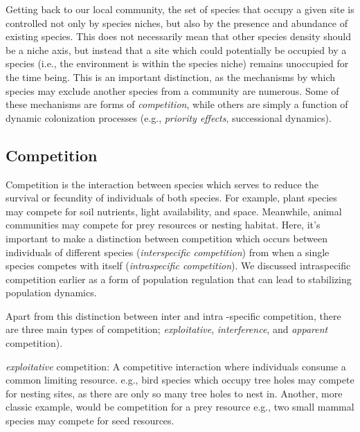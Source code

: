 \documentclass[12pt]{article}
\begin{document}
Getting back to our local community, the set of species that occupy a given site is controlled not only by species niches, but also by the presence and abundance of existing species. This does not necessarily mean that other species density should be a niche axis, but instead that a site which could potentially be occupied by a species (i.e., the environment is within the species niche) remains unoccupied for the time being. This is an important distinction, as the mechanisms by which species may exclude another species from a community are numerous. Some of these mechanisms are forms of \textit{competition}, while others are simply a function of dynamic colonization processes (e.g., \textit{priority effects}, successional dynamics). 












\clearpage
\subsection*{Competition}

Competition is the interaction between species which serves to reduce the survival or fecundity of individuals of both species. For example, plant species may compete for soil nutrients, light availability, and space. Meanwhile, animal communities may compete for prey resources or nesting habitat. Here, it's important to make a distinction between competition which occurs between individuals of different species (\textit{interspecific competition}) from when a single species competes with itself (\textit{intraspecific competition}). We discussed intraspecific competition earlier as a form of population regulation that can lead to stabilizing population dynamics. 

Apart from this distinction between inter and intra -specific competition, there are three main types of competition; \textit{exploitative},  \textit{interference},  and \textit{apparent} competition). 



\textit{exploitative} competition: A competitive interaction where individuals consume a common limiting resource. e.g., bird species which occupy tree holes may compete for nesting sites, as there are only so many tree holes to nest in. Another, more classic example, would be competition for a prey resource e.g., two small mammal species may compete for seed resources. 
\end{document}
